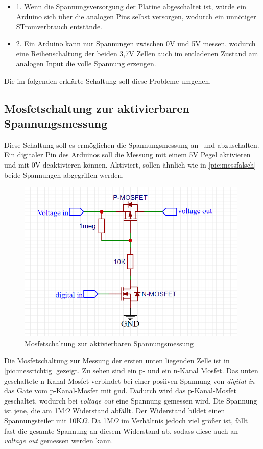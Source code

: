 \begin{center}
	\begin{itemize}
		\item 1. Wenn die Spannungsversorgung der Platine abgeschaltet ist, würde ein Arduino sich über die analogen Pins selbst versorgen, wodurch ein unnötiger STromverbrauch entstände.
		\item 2. Ein Arduino kann nur Spannungen zwischen 0V und 5V messen, wodurch eine Reihenschaltung der beiden 3,7V Zellen auch im entladenen Zustand am analogen Input die volle Spannung erzeugen. 
	\end{itemize}
\end{center}

Die im folgenden erklärte Schaltung soll diese Probleme umgehen.
\newpage
\subsection{Mosfetschaltung zur aktivierbaren Spannungsmessung}
Diese Schaltung soll es ermöglichen die Spannungsmessung an- und abzuschalten. Ein digitaler Pin des Arduinos soll die Messung mit einem 5V Pegel aktivieren und mit 0V deaktivieren können. Aktiviert, sollen ähnlich wie in \autoref{pic:messfalsch} beide Spannungen abgegriffen werden.

\begin{figure}[h]
	\begin{center}
		\includegraphics[width=11cm]{messRichtig.PNG}
		\caption{\label{pic:messrichtig} Mosfetschaltung zur aktivierbaren Spannungsmessung}
	\end{center}
\end{figure}

Die Mosfetschaltung zur Messung der ersten unten liegenden Zelle ist in \autoref{pic:messrichtig} gezeigt.
Zu sehen sind ein p- und ein n-Kanal Mosfet. Das unten geschaltete n-Kanal-Mosfet verbindet bei einer posiiven Spannung von \textit{digital in} das Gate vom p-Kanal-Mosfet mit \gls{gnd}. Dadurch wird das p-Kanal-Mosfet geschaltet, wodurch bei \textit{voltage out} eine Spannung gemessen wird. Die Spannung ist jene, die am 1M$\Omega$ Widerstand abfällt. Der Widerstand bildet einen Spannungsteiler mit 10K$\Omega$. Da 1M$\Omega$ im Verhältnis jedoch viel größer ist, fällt fast die gesamte Spannung an diesem Widerstand ab, sodass diese auch an \textit{voltage out} gemessen werden kann.

